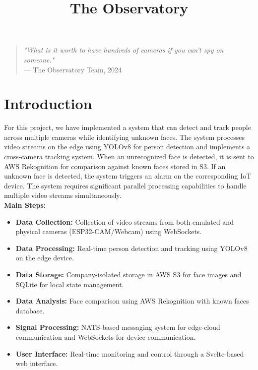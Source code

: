 \documentclass[conference]{IEEEtran}
\begin{document}
\title{The Observatory}

\author{
      \and
      \and
}

\maketitle

\begin{quote}
\textit{"What is it worth to have hundreds of cameras if you can't spy on someone."}\\
--- The Observatory Team, 2024
\end{quote}

\section{Introduction}
For this project, we have implemented a system that can detect and track people across multiple cameras while identifying unknown faces.
The system processes video streams on the edge using YOLOv8 for person detection and implements a cross-camera tracking system.
When an unrecognized face is detected, it is sent to AWS Rekognition for comparison against known faces stored in S3.
If an unknown face is detected, the system triggers an alarm on the corresponding IoT device.
The system requires significant parallel processing capabilities to handle multiple video streams simultaneously.
\\
\textbf{Main Steps:}
\begin{itemize}
      \item \textbf{Data Collection:} Collection of video streams from both emulated and physical cameras (ESP32-CAM/Webcam) using WebSockets.
      \item \textbf{Data Processing:} Real-time person detection and tracking using YOLOv8 on the edge device.
      \item \textbf{Data Storage:} Company-isolated storage in AWS S3 for face images and SQLite for local state management.
      \item \textbf{Data Analysis:} Face comparison using AWS Rekognition with known faces database.
      \item \textbf{Signal Processing:} NATS-based messaging system for edge-cloud communication and WebSockets for device communication.
      \item \textbf{User Interface:} Real-time monitoring and control through a Svelte-based web interface.
\end{itemize}
\end{document}
